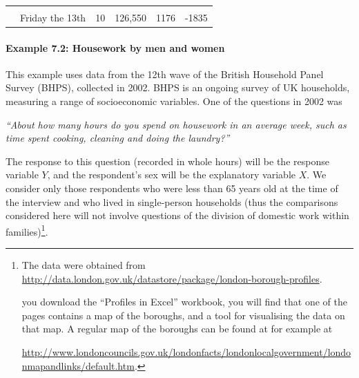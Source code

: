 \documentclass[11pt,a4paper,openany]{book}
\let\oldparagraph\paragraph
\renewcommand{\paragraph}[1]{\oldparagraph{#1}\mbox{}}
\let\rmarkdownfootnote\footnote%
\def\footnote{\protect\rmarkdownfootnote}
\begin{document}
\begin{longtable}[]{@{}lrrrr@{}}
\begin{minipage}[t]{0.07\columnwidth}
\end{minipage} & \begin{minipage}[t]{0.08\columnwidth}\raggedleft\strut
\strut
\end{minipage}\tabularnewline
\begin{minipage}[t]{0.55\columnwidth}\raggedright\strut
~~Friday the 13th\strut
\end{minipage} & \begin{minipage}[t]{0.06\columnwidth}\raggedleft\strut
10\strut
\end{minipage} & \begin{minipage}[t]{0.10\columnwidth}\raggedleft\strut
126,550\strut
\end{minipage} & \begin{minipage}[t]{0.07\columnwidth}\raggedleft\strut
1176\strut
\end{minipage} & \begin{minipage}[t]{0.08\columnwidth}\raggedleft\strut
-1835\strut
\end{minipage}\tabularnewline
\bottomrule
\end{longtable}

\paragraph{Example 7.2: Housework by men and women}\label{p-ex72}

This example uses data from the 12th wave of the British Household Panel
Survey (BHPS), collected in 2002. BHPS is an ongoing survey of UK
households, measuring a range of socioeconomic variables. One of the
questions in 2002 was

\emph{``About how many hours do you spend on housework in an average
week, such as time spent cooking, cleaning and doing the laundry?''}

The response to this question (recorded in whole hours) will be the
response variable \(Y\), and the respondent's sex will be the
explanatory variable \(X\). We consider only those respondents who were
less than 65 years old at the time of the interview and who lived in
single-person households (thus the comparisons considered here will not
involve questions of the division of domestic work within
families)\footnote{The data were obtained from
  \url{http://data.london.gov.uk/datastore/package/london-borough-profiles}.

  \noindentIf you download the ``Profiles in Excel'' workbook, you will
  find that one of the pages contains a map of the boroughs, and a tool
  for visualising the data on that map. A regular map of the boroughs
  can be found at for example at

  \url{http://www.londoncouncils.gov.uk/londonfacts/londonlocalgovernment/londonmapandlinks/default.htm}.}.
\end{document}
